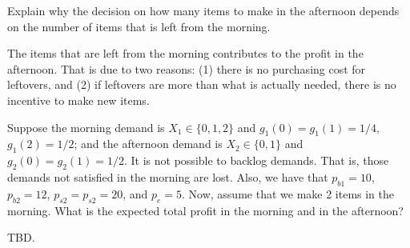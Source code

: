 \begin{question}
Explain why the decision on how many items to make in the afternoon depends on the number of items that is left from the morning. 

\begin{solution}
The items that are left from the morning contributes to the profit in the afternoon. That is due to two reasons: (1) there is no purchasing cost for leftovers, and (2) if leftovers are more than what is actually needed, there is no incentive to make new items. 
\end{solution}
\end{question}


\begin{question}
Suppose the morning demand is $X_1\in \{0,1,2\}$ and $g_1(0)=g_1(1)=1/4$, $g_1(2)=1/2$; and the afternoon demand is $X_2\in \{0,1\}$ and $g_2(0)=g_2(1)=1/2$. It is not possible to backlog demands. That is, those demands not satisfied in the morning are lost. Also, we have that $p_{b1}=10$, $p_{b2}=12$, $p_{s2}=p_{s2}=20$, and $p_e=5$. Now, assume that we make 2 items in the morning. What is the expected total profit in the morning and in the afternoon?
\begin{solution}
TBD.

%
%
%
%
%
%
%
%

\end{solution}

\end{question}

